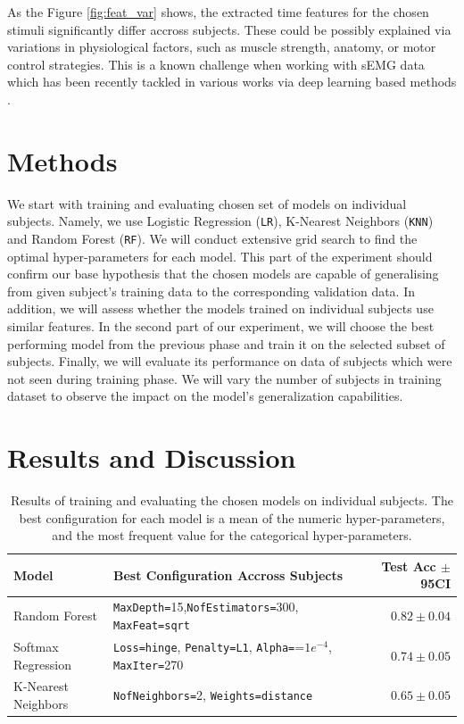 \documentclass[10pt]{article}
\begin{document}
As the Figure \ref{fig:feat_var} shows, the extracted time features for the chosen stimuli significantly differ accross subjects.
These could be possibly explained via variations in physiological factors, such as muscle strength, anatomy, or motor control strategies. 
This is a known challenge when working with sEMG data which has been recently tackled in various works 
via deep learning based methods \cite{dl2, dl1}. 

\section{Methods}
We start with training and evaluating chosen set of models on individual subjects. Namely, we use Logistic Regression (\texttt{LR}), K-Nearest Neighbors (\texttt{KNN})
and Random Forest (\texttt{RF}). We will conduct extensive grid search to find the optimal hyper-parameters for each model. 
This part of the experiment should confirm our base hypothesis that the chosen models are capable of generalising from given subject's training data to the corresponding validation data.
In addition, we will assess whether the models trained on individual subjects use similar features. In the second part of our experiment, we will choose the best performing model from the previous phase 
and train it on the selected  subset of subjects. Finally, we will evaluate its performance on data of subjects which were not seen during training phase.
We will vary the number of subjects in training dataset to observe the impact on the model's generalization capabilities.


\section{Results and Discussion}
\begin{table}[!h]
    \centering
    \begin{tabular}{llr}
        \toprule
        \textbf{Model} & \textbf{Best Configuration Accross Subjects} & \textbf{Test Acc $\pm$ 95CI} \\
        \midrule
        Random Forest & \texttt{MaxDepth=}15,\texttt{NofEstimators=}300, \texttt{MaxFeat=}\texttt{sqrt} & $\mathbf{0.82 \pm0.04}$ \\
        Softmax Regression & \texttt{Loss=hinge}, \texttt{Penalty=L1}, \texttt{Alpha=}=$1e^{-4}$, \texttt{MaxIter=}270 &  $0.74 \pm0.05$ \\
        K-Nearest Neighbors & \texttt{NofNeighbors=}2, \texttt{Weights=distance} &  $0.65 \pm0.05$ \\
        \bottomrule
    \end{tabular}
    \caption{Results of training and evaluating the chosen models on individual subjects. The best configuration for each model is a mean of the numeric hyper-parameters, and the most frequent value for the categorical hyper-parameters.}
    \label{tab:results1}
\end{table}
\end{document}
